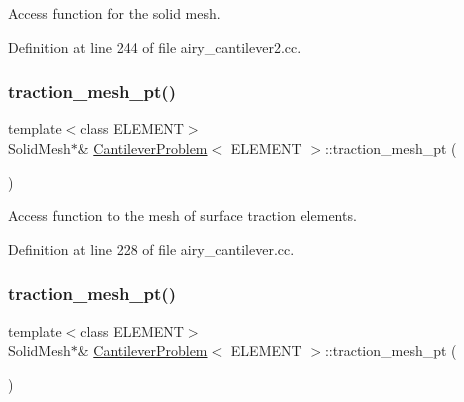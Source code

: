 Access function for the solid mesh. 



Definition at line 244 of file airy\+\_\+cantilever2.\+cc.

\mbox{\label{classCantileverProblem_af9e9b4a4686ac29bc7e4ef5d6baeae5a}} 
\subsubsection{\texorpdfstring{traction\+\_\+mesh\+\_\+pt()}{traction\_mesh\_pt()}\hspace{0.1cm}{\footnotesize\ttfamily [1/2]}}
{\footnotesize\ttfamily template$<$class E\+L\+E\+M\+E\+NT$>$ \\
Solid\+Mesh$\ast$\& \hyperlink{classCantileverProblem}{Cantilever\+Problem}$<$ E\+L\+E\+M\+E\+NT $>$\+::traction\+\_\+mesh\+\_\+pt (\begin{DoxyParamCaption}{ }\end{DoxyParamCaption})\hspace{0.3cm}{\ttfamily [inline]}}



Access function to the mesh of surface traction elements. 



Definition at line 228 of file airy\+\_\+cantilever.\+cc.

\mbox{\label{classCantileverProblem_af9e9b4a4686ac29bc7e4ef5d6baeae5a}} 
\subsubsection{\texorpdfstring{traction\+\_\+mesh\+\_\+pt()}{traction\_mesh\_pt()}\hspace{0.1cm}{\footnotesize\ttfamily [2/2]}}
{\footnotesize\ttfamily template$<$class E\+L\+E\+M\+E\+NT$>$ \\
Solid\+Mesh$\ast$\& \hyperlink{classCantileverProblem}{Cantilever\+Problem}$<$ E\+L\+E\+M\+E\+NT $>$\+::traction\+\_\+mesh\+\_\+pt (\begin{DoxyParamCaption}{ }\end{DoxyParamCaption})\hspace{0.3cm}{\ttfamily [inline]}}



